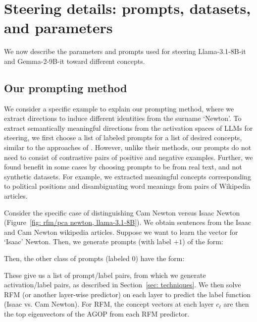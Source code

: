 \section{Steering details: prompts, datasets, and parameters}
\label{app: prompts}

We now describe the parameters and prompts used for steering Llama-3.1-8B-it and Gemma-2-9B-it toward different concepts.

\subsection{Our prompting method}

We consider a specific example to explain our prompting method, where we extract directions to induce different identities from the surname `Newton'. To extract semantically meaningful directions from the activation spaces of LLMs for steering, we first choose a list of labeled prompts for a list of desired concepts, similar to the approaches of \citet{representation_engineering, turner2023activation}. However, unlike their methods, our prompts do not need to consist of contrastive pairs of positive and negative examples. Further, we found benefit in some cases by choosing prompts to be from real text, and not synthetic datasets. For example, we extracted meaningful concepts corresponding to political positions and disambiguating word meanings from pairs of Wikipedia articles. 

Consider the specific case of distinguishing Cam Newton versus Isaac Newton (Figure~\ref{fig: rfm/pca newton, llama-3.1-8B}). We obtain sentences from the Isaac and Cam Newton wikipedia articles. 
Suppose we want to learn the vector for `Isaac' Newton. Then, we generate prompts (with label $+1$) of the form:
\begin{center}
\end{center}
Then, the other class of prompts (labeled $0$) have the form:
\begin{center}
\end{center}
These give us a list of prompt/label pairs, from which we generate activation/label pairs, as described in Section~\ref{sec: techniques}. We then solve RFM (or another layer-wise predictor) on each layer to predict the label function (Isaac vs. Cam Newton). For RFM, the concept vectors at each layer $c_\ell$ are then the top eigenvectors of the AGOP from each RFM predictor.


